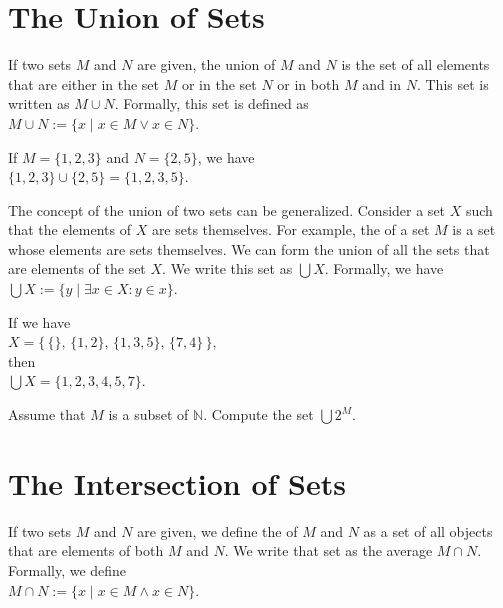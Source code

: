 \section{The Union of Sets}
If two sets $M$ and $N$ are given, the union
of $M$ and $N$ is the set of all elements that are either in the set $M$ or in the set $N$ or in both $M$ and
in $N$.  This set is written as $M \cup N$.
Formally, this set is defined as 
\\[0.2cm]
\hspace*{1.3cm} $M \cup N := \{ x \;|\; x \in M \vee x \in N \}$. 

\exampleEng
If $M = \{1,2,3\}$ and $N = \{2,5\}$, we have 
\\[0.2cm]
\hspace*{1.3cm} 
$\{1,2,3\} \cup \{2,5\} = \{1,2,3,5\}$.  \eox
\vspace*{0.2cm}

The concept of the union of two sets can be generalized.  Consider
a set $X$ such that the elements of $X$ are sets themselves. For example, the
 of a set $M$ is a set whose elements are sets themselves.  We can form the union of all the 
sets that are elements of the set $X$.  We write this set as $\bigcup X$.  Formally,
we have
\\[0.2cm]
\hspace*{1.3cm} $\bigcup X := \{ y \;|\; \exists x \in X: y \in x \}$.

\exampleEng
If we have \\[0.2cm]
\hspace*{1.3cm}
 $X = \big\{\, \{\},\, \{1,2\}, \, \{1,3,5\}, \, \{7,4\}\,\big\}$, \\[0.2cm]
then \\[0.2cm] 
\hspace*{1.3cm}
 $\bigcup X = \{ 1, 2, 3, 4, 5, 7 \}$. \eox
\vspace*{0.2cm}

\exerciseEng
Assume that $M$ is a subset of $\mathbb{N}$.  Compute the set $\bigcup 2^M$.
\eox

\section{The Intersection of Sets}
If two sets $M$ and $N$ are given, we define the  of $M$ and $N$ as a set of all objects that are
elements of both $M$ and  $N$.  We write that set as the average $M \cap N$.
Formally, we define 
\\[0.2cm]
\hspace*{1.3cm} $M \cap N := \{ x \mid x \in M \wedge x \in N \}$.

